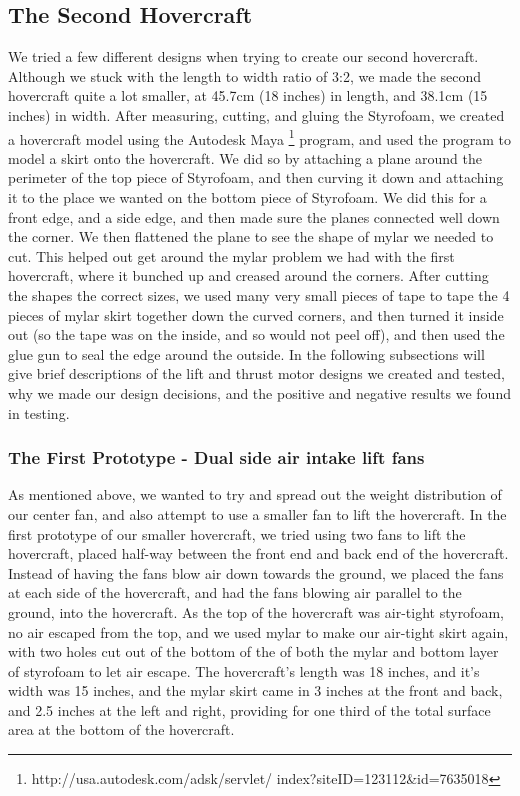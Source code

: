 \subsection{The Second Hovercraft}
We tried a few different designs when trying to create our second hovercraft. Although we stuck with the length to width ratio
of 3:2, we made the second hovercraft quite a lot smaller, at 45.7cm (18 inches) in length, and 38.1cm (15 inches) in width.
After measuring, cutting, and gluing the Styrofoam, we created a hovercraft
model using the Autodesk Maya \footnote{ http://usa.autodesk.com/adsk/servlet/ index?siteID=123112\&id=7635018 }
program, and used the program to model a skirt onto the hovercraft. We did so by attaching a plane around the perimeter of the
top piece of Styrofoam, and then curving it down and attaching it to the place we wanted on the bottom piece of Styrofoam. We
did this for a front edge, and a side edge, and then made sure the planes connected well down the corner. We then flattened the plane
to see the shape of mylar we needed to cut. This helped out get around the mylar problem we had with the first hovercraft, where
it bunched up and creased around the corners. After cutting the shapes the correct sizes, we used many very small pieces of tape
to tape the 4 pieces of mylar skirt together down the curved corners, and then turned it inside out (so the tape was on the inside,
and so would not peel off), and then used the glue gun to seal the edge around the outside. In the following subsections will give 
brief descriptions of the lift and thrust motor designs we created and tested, why we made our design decisions, and the positive 
and negative results we found in testing.

\subsubsection{The First Prototype - Dual side air intake lift fans}
As mentioned above, we wanted to try and spread
out the weight distribution of our center fan, and also attempt to use a smaller fan to lift the hovercraft. In the first
prototype of our smaller hovercraft, we tried using two fans to lift the hovercraft, placed half-way between the front end
and back end of the hovercraft. Instead of having the fans blow air down towards the ground, we placed the fans at each side
of the hovercraft, and had the fans blowing air parallel to the ground, into the hovercraft. As the top of the hovercraft was
air-tight styrofoam, no air escaped from the top, and we used mylar to make our air-tight skirt again, with two holes cut out
of the bottom of the of both the mylar and bottom layer of styrofoam to let air escape. The hovercraft's length was 18 inches,
and it's width was 15 inches, and the mylar skirt came in 3 inches at the front and back, and 2.5 inches at the left and right,
providing for one third of the total surface area at the bottom of the hovercraft.

